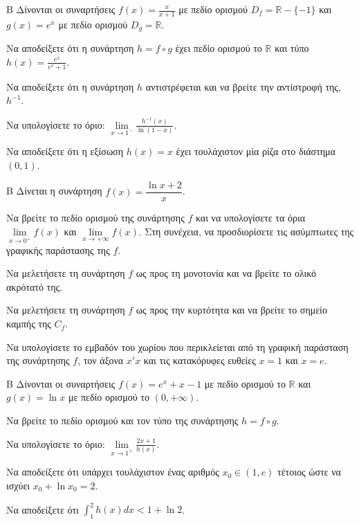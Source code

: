 \begin{thema}{Β}
Δίνονται οι συναρτήσεις $f(x) = \frac{x}{x+1}$ με πεδίο ορισμού $D_f = \mathbb{R} - \{-1\}$ και $g(x) = e^x$ με πεδίο ορισμού $D_g = \mathbb{R}$.
\begin{erwthma}
\item Να αποδείξετε ότι η συνάρτηση $h = f \circ g$ έχει πεδίο ορισμού το $\mathbb{R}$ και τύπο $h(x) = \frac{e^x}{e^x+1}$.
\item Να αποδείξετε ότι η συνάρτηση $h$ αντιστρέφεται και να βρείτε την αντίστροφή της, $h^{-1}$.
\item Να υπολογίσετε το όριο: $\lim\limits_{x \to 1^-} \frac{h^{-1}(x)}{\ln(1-x)}$.
\item Να αποδείξετε ότι η εξίσωση $h(x) = x$ έχει τουλάχιστον μία ρίζα στο διάστημα $(0, 1)$.
\end{erwthma}
\end{thema}
\begin{thema}{Β}
Δίνεται η συνάρτηση $f(x) = \dfrac{\ln x + 2}{x}$.
\begin{erwthma}
\item Να βρείτε το πεδίο ορισμού της συνάρτησης $f$ και να υπολογίσετε τα όρια $\lim\limits_{x \to 0^+} f(x)$ και $\lim\limits_{x \to +\infty} f(x)$. Στη συνέχεια, να προσδιορίσετε τις ασύμπτωτες της γραφικής παράστασης της $f$.
\item Να μελετήσετε τη συνάρτηση $f$ ως προς τη μονοτονία και να βρείτε το ολικό ακρότατό της.
\item Να μελετήσετε τη συνάρτηση $f$ ως προς την κυρτότητα και να βρείτε το σημείο καμπής της $C_f$.
\item Να υπολογίσετε το εμβαδόν του χωρίου που περικλείεται από τη γραφική παράσταση της συνάρτησης $f$, τον άξονα $x'x$ και τις κατακόρυφες ευθείες $x = 1$ και $x = e$.
\end{erwthma}
\end{thema}
\begin{thema}{Β}
Δίνονται οι συναρτήσεις $f(x) = e^x + x - 1$ με πεδίο ορισμού το $\mathbb{R}$ και $g(x) = \ln x$ με πεδίο ορισμού το $(0, +\infty)$.
\begin{erwthma}
\item Να βρείτε το πεδίο ορισμού και τον τύπο της συνάρτησης $h = f \circ g$.
\item Να υπολογίσετε το όριο: $\lim\limits_{x \to 1^+} \frac{2x+1}{h(x)}$.
\item Να αποδείξετε ότι υπάρχει τουλάχιστον ένας αριθμός $x_0 \in (1, e)$ τέτοιος ώστε να ισχύει $x_0 + \ln x_0 = 2$.
\item Να αποδείξετε ότι $\displaystyle\int_{1}^{2} h(x) dx < 1 + \ln 2$.
\end{erwthma}
\end{thema}
